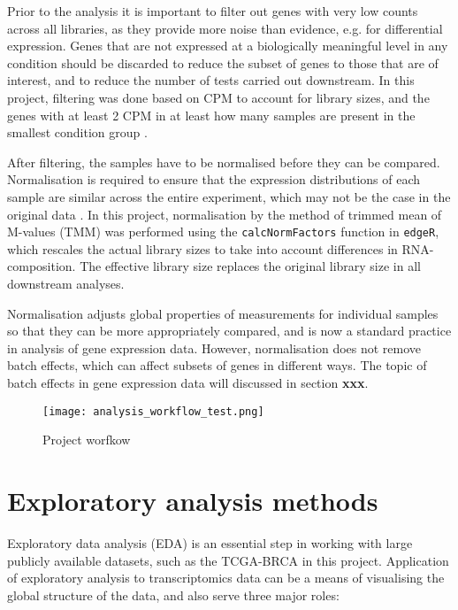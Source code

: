     Prior to the analysis it is important to filter out genes with very low counts across all libraries, as they provide more noise than evidence, e.g. for differential expression. Genes that are not expressed at a biologically meaningful level in any condition should be discarded to reduce the subset of genes to those that are of interest, and to reduce the number of tests carried out downstream. In this project, filtering was done based on CPM to account for library sizes, and the genes with at least 2 CPM in at least how many samples are present in the smallest condition group \cite{}.
    
    After filtering, the samples have to be normalised before they can be compared. Normalisation is required to ensure that the expression distributions of each sample are similar across the entire experiment, which may not be the case in the original data \cite{Robinson2010}. In this project, normalisation by the method of trimmed mean of M-values (TMM) \cite{RobinsonAData} was performed using the \texttt{calcNormFactors} function in \texttt{edgeR}, which rescales the actual library sizes to take into account differences in RNA-composition. The effective library size replaces the original library size in all downstream analyses. 
    
    Normalisation adjusts global properties of measurements for individual samples so that they can be more appropriately compared, and is now a standard practice in analysis of gene expression data. However, normalisation does not remove batch effects, which can affect subsets of genes in different ways. The topic of batch effects in gene expression data will discussed in section \textbf{xxx}. 

    
            \begin{figure}[h]
            \centering
            \texttt{[image: analysis\_workflow\_test.png]}
            \caption{Project worfkow }
            \label{fig:workflow}
            \end{figure} 
    
   
    
    
   
\newpage    
\section{Exploratory analysis methods}
    
    Exploratory data analysis (EDA) is an essential step in working with large publicly available datasets, such as the TCGA-BRCA in this project. Application of exploratory analysis to transcriptomics data can be a means of visualising the global structure of the data, and also serve three major roles: 
    
